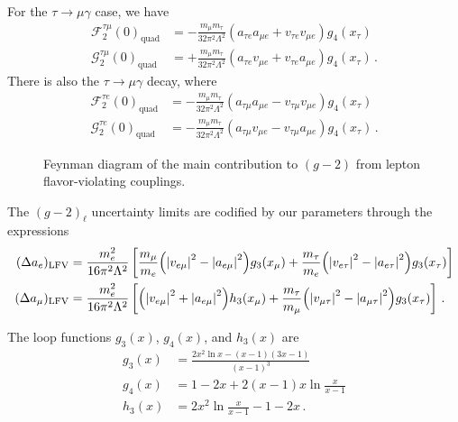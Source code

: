 \documentclass[prd,amsfonts,onecolumn,superscriptaddress,aps,nofootinbib,11pt]{revtex4-1}
\begin{document}
For the $\tau \to \mu \gamma$ case, we have
\begin{equation}\label{eq:FandGeta}
    \begin{split}
        \mathcal{F}^{\tau \mu}_2(0)_{\text{quad}} &= -\frac{m_\mu m_\tau}{32 \pi^2 \Lambda^2} (a_{\tau e} a_{\mu e} + v_{\tau e} v_{\mu e}) g_4(x_\tau) \\
        \mathcal{G}^{\tau \mu}_2(0)_{\text{quad}} &= +\frac{m_\mu m_\tau}{32 \pi^2 \Lambda^2} (a_{\tau e} v_{\mu e} + v_{\tau e} a_{\mu e}
        ) g_4(x_\tau) \,.
    \end{split}
\end{equation}
There is also the $\tau \to \mu \gamma$ decay, where
\begin{equation}\label{eq:FandGmuta}
    \begin{split}
        \mathcal{F}^{\tau e}_2(0)_{\text{quad}} &= -\frac{m_\mu m_\tau}{32 \pi^2 \Lambda^2} (a_{\tau \mu} a_{\mu e} - v_{\tau \mu} v_{\mu e}) g_4(x_\tau) \\
        \mathcal{G}^{\tau e}_2(0)_{\text{quad}} &= -\frac{m_\mu m_\tau}{32 \pi^2 \Lambda^2} (a_{\tau \mu} v_{\mu e} - v_{\tau \mu} a_{\mu e}) g_4(x_\tau) \,.
    \end{split}
\end{equation}

\begin{figure}
    \centering
    
    \caption{Feynman diagram of the main contribution to $(g-2)$ from lepton flavor-violating couplings.}
    \label{fig:g-2-tikz}
\end{figure}

The $(g-2)_{\ell}$ uncertainty limits are codified by our parameters through the expressions
\begin{equation}\label{eq:g-2}
    \begin{split}
        (\Delta a_e)_{\rm{LFV}} &=  \frac{m_e^2}{16 \pi^2 \Lambda^2} \left[ \frac{m_\mu}{m_e}\qty(\abs{v_{e\mu}}^2- \abs{a_{e\mu}}^2)g_3(x_\mu) + \frac{m_\tau}{m_e} \qty( \abs{v_{e \tau}}^2 - \abs{a_{e \tau}}^2)g_3(x_\tau)  \right] \\
        (\Delta a_\mu)_{\rm{LFV}} &= \frac{m_e^2}{16 \pi^2 \Lambda^2} \left[ \qty(\abs{v_{e\mu}}^2+ \abs{a_{e\mu}}^2)h_3(x_\mu) + \frac{m_\tau}{m_\mu} \qty( \abs{v_{\mu \tau}}^2 - \abs{a_{\mu \tau}}^2)g_3(x_\tau)  \right] \,.
    \end{split}
\end{equation}

The loop functions $g_3(x)$, $g_4(x)$, and $h_3(x)$ are
\begin{equation}
    \begin{split}
        g_3(x) &= \frac{2x^2 \ln x - (x-1)(3x-1)}{(x-1)^3} \\
        g_4(x) &= 1 - 2x + 2(x-1)x \ln \frac{x}{x-1} \\
        h_3(x) &= 2x^2 \ln \frac{x}{x-1} -1 -2x\,.
    \end{split}
\end{equation}

 
\end{document}
